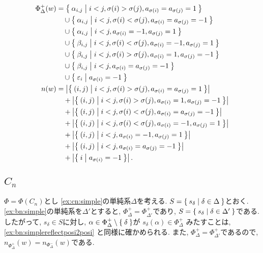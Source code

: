 \begin{align*}
  \Phi_\Delta^+(w)
  &=
  \Set{\alpha_{i,j}|i<j,\sigma(i)>\sigma(j),a_{\sigma(i)}=a_{\sigma(j)}=1}\\
  &\quad \cup\Set{\alpha_{i,j}|i<j,\sigma(i)<\sigma(j),a_{\sigma(i)}=a_{\sigma(j)}=-1}\\
  &\quad \cup\Set{\alpha_{i,j}|i<j,a_{\sigma(i)}=-1,a_{\sigma(j)}=1}\\
  &\quad \cup\Set{\beta_{i,j}|i<j,\sigma(i)<\sigma(j),a_{\sigma(i)}=-1,a_{\sigma(j)}=1}\\
  &\quad \cup\Set{\beta_{i,j}|i<j,\sigma(i)>\sigma(j),a_{\sigma(i)}=1,a_{\sigma(j)}=-1}\\
  &\quad \cup\Set{\beta_{i,j}|i<j,a_{\sigma(i)}=a_{\sigma(j)}=-1}\\
  &\quad \cup\Set{\varepsilon_{i}|a_{\sigma(i)}=-1}\\
  n(w)
  &=\left|\Set{(i,j)|i<j,\sigma(i)>\sigma(j),a_{\sigma(i)}=a_{\sigma(j)}=1}\right|\\
  &\quad +\left|\Set{(i,j)|i<j,\sigma(i)>\sigma(j),a_{\sigma(i)}=1,a_{\sigma(j)}=-1}\right|\\
  &\quad +\left|\Set{(i,j)|i<j,\sigma(i)<\sigma(j),a_{\sigma(i)}=a_{\sigma(j)}=-1}\right|\\
  &\quad +\left|\Set{(i,j)|i<j,\sigma(i)<\sigma(j),a_{\sigma(i)}=-1,a_{\sigma(j)}=1}\right|\\
  &\quad +\left|\Set{(i,j)|i<j,a_{\sigma(i)}=-1,a_{\sigma(j)}=1}\right|\\
  &\quad +\left|\Set{(i,j)|i<j,a_{\sigma(i)}=a_{\sigma(j)}=-1}\right|\\
  &\quad +\left|\Set{i|a_{\sigma(i)}=-1}\right|.
\end{align*}

\subsection{$C_{n}$}
$\Phi=\Phi(C_n)$とし
\cref{ex:cn:simple}の単純系$\Delta$を考える.
$S=\Set{s_\delta|\delta\in \Delta}$とおく.
\cref{ex:bn:simple}の単純系を$\Delta'$とすると,
$\Phi_\Delta^+=\Phi_{\Delta'}^+$であり,
$S=\Set{s_\delta|\delta\in \Delta'}$である.
したがって, 
$s_\delta\in S$に対し,
$\alpha\in\Phi_\Delta^+\setminus\Set{\delta}$が
$s_{\delta}(\alpha)\in\Phi_\Delta^+$
みたすことは, 
\cref{ex:bn:simplereflectposi2posi}
と同様に確かめられる.
また, 
$\Phi_\Delta^+=\Phi_{\Delta'}^+$であるので,
$n_{\Phi_\Delta^+}(w)=n_{\Phi_{\Delta}^-}(w)$である.

